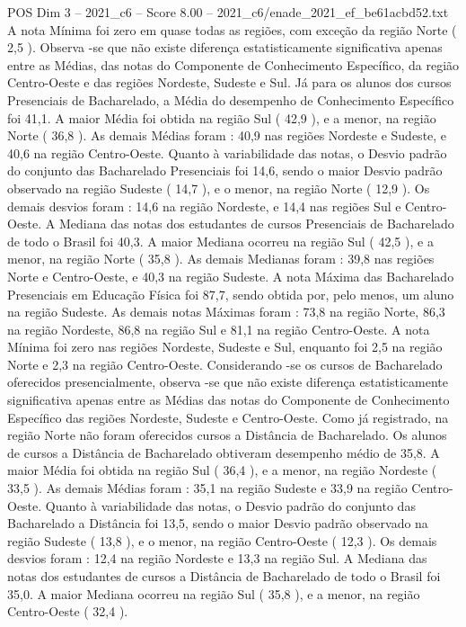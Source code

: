 \begin{textsample}{POS Dim 3 – 2021\_c6 – Score 8.00 – 2021\_c6/enade\_2021\_ef\_be61acbd52.txt}
A nota Mínima foi zero em quase todas as regiões, com exceção da região Norte ( 2,5 ).
Observa -se que não existe diferença estatisticamente significativa apenas entre as Médias, das notas do Componente de Conhecimento Específico, da região Centro-Oeste e das regiões Nordeste, Sudeste e Sul.
Já para os alunos dos cursos Presenciais de Bacharelado, a Média do desempenho de Conhecimento Específico foi 41,1.
A maior Média foi obtida na região Sul ( 42,9 ), e a menor, na região Norte ( 36,8 ).
As demais Médias foram : 40,9 nas regiões Nordeste e Sudeste, e 40,6 na região Centro-Oeste.
Quanto à variabilidade das notas, o Desvio padrão do conjunto das Bacharelado Presenciais foi 14,6, sendo o maior Desvio padrão observado na região Sudeste ( 14,7 ), e o menor, na região Norte ( 12,9 ).
Os demais desvios foram : 14,6 na região Nordeste, e 14,4 nas regiões Sul e Centro-Oeste.
A Mediana das notas dos estudantes de cursos Presenciais de Bacharelado de todo o Brasil foi 40,3.
A maior Mediana ocorreu na região Sul ( 42,5 ), e a menor, na região Norte ( 35,8 ).
As demais Medianas foram : 39,8 nas regiões Norte e Centro-Oeste, e 40,3 na região Sudeste.
A nota Máxima das Bacharelado Presenciais em Educação Física foi 87,7, sendo obtida por, pelo menos, um aluno na região Sudeste.
As demais notas Máximas foram : 73,8 na região Norte, 86,3 na região Nordeste, 86,8 na região Sul e 81,1 na região Centro-Oeste.
A nota Mínima foi zero nas regiões Nordeste, Sudeste e Sul, enquanto foi 2,5 na região Norte e 2,3 na região Centro-Oeste.
Considerando -se os cursos de Bacharelado oferecidos presencialmente, observa -se que não existe diferença estatisticamente significativa apenas entre as Médias das notas do Componente de Conhecimento Específico das regiões Nordeste, Sudeste e Centro-Oeste.
Como já registrado, na região Norte não foram oferecidos cursos a Distância de Bacharelado.
Os alunos de cursos a Distância de Bacharelado obtiveram desempenho médio de 35,8.
A maior Média foi obtida na região Sul ( 36,4 ), e a menor, na região Nordeste ( 33,5 ).
As demais Médias foram : 35,1 na região Sudeste e 33,9 na região Centro-Oeste.
Quanto à variabilidade das notas, o Desvio padrão do conjunto das Bacharelado a Distância foi 13,5, sendo o maior Desvio padrão observado na região Sudeste ( 13,8 ), e o menor, na região Centro-Oeste ( 12,3 ).
Os demais desvios foram : 12,4 na região Nordeste e 13,3 na região Sul.
A Mediana das notas dos estudantes de cursos a Distância de Bacharelado de todo o Brasil foi 35,0.
A maior Mediana ocorreu na região Sul ( 35,8 ), e a menor, na região Centro-Oeste ( 32,4 ).

\end{textsample}
